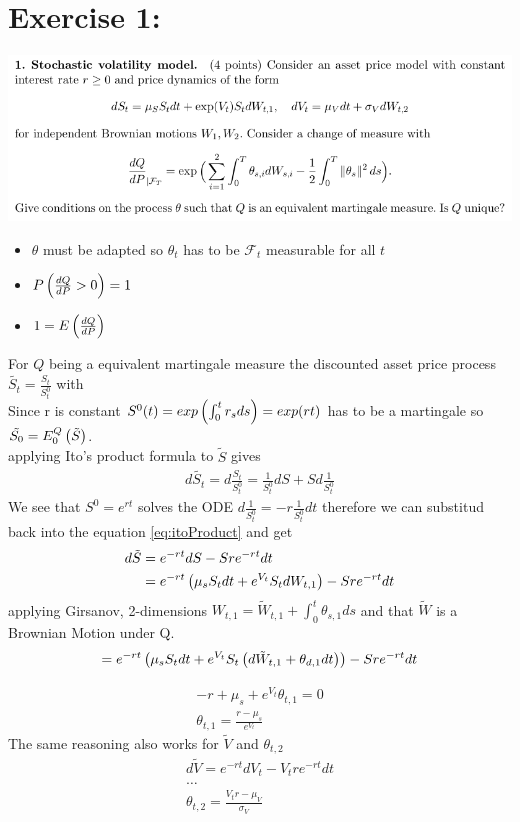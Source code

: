 \documentclass[document.tex]{subfiles}
\begin{document}
\section*{Exercise 1:}

\includegraphics[width=\textwidth]{ex1.png}
\begin{itemize}
	\item $\theta$ must be adapted so $\theta_t$ has to be  $\mathcal{F}_t$ measurable for all $t$ \\ 
	\item $P \left( \frac{dQ}{dP} > 0 \right) =1 $
	\item $1 = E \left( \frac{dQ}{dP} \right)$ 
\end{itemize}

For $Q$ being a equivalent martingale measure the discounted asset price process $\tilde{S_t} = \frac{S_t}{S^0_t}$ with \\ 
Since r is constant $S^0 (t) = exp \left( \int_0^t r_s ds \right) = exp(rt)$  has to be a martingale so $\tilde{S_0}= E^Q_0 \left( \tilde{S} \right)$.\\

applying Ito's product formula to $\tilde{S}$ gives
\begin{align}
	d \tilde{S_t} = d \frac{S_t}{S^0_t}
	= \frac{1}{S^0_t} d S + S d \frac{1}{S^0_t}  \label{eq:itoProduct}
  \end{align}
We see that $S^0=e^{rt}$ solves the ODE $d \frac{1}{S^0_t}=-r \frac{1}{S^0_t} dt$
therefore we can substitud back into the equation \eqref{eq:itoProduct} and get
\begin{align}
	d \tilde{S} &= e^{-rt} d S - S r e^{-rt} dt \\
	&= e^{-rt} \left( \mu_s S_t dt + e^{V_t} S_t dW_{t,1} \right)  - S r e^{-rt} dt 
\end{align}
applying Girsanov, 2-dimensions $W_{t,1} = \tilde{W}_{t,1} + \int_0^t \theta_{s,1} ds$ and that $\tilde{W}$ is a Brownian Motion under Q.	
\begin{align}
	= e^{-rt} \left( \mu_s S_t dt + e^{V_t} S_t \left( d\tilde{W}_{t,1} + \theta_{d,1} dt \right) \right)  - S r e^{-rt} dt \\
\end{align}

\begin{align}
	-r + \mu_s + e^{V_t} \theta_{t,1} =0 \\
	\theta_{t,1} = \frac{r-\mu_s}{e^{V_t}}
\end{align}
The same reasoning also works for $\tilde{V}$ and $\theta_{t,2}$
\begin{align*}
	d \tilde{V} = e^{-rt} d V_t - V_t r e^{-rt} dt \\
	\dots \\
	\theta_{t,2} = \frac{V_t r - \mu_V }{\sigma_V}
\end{align*}
\end{document}
